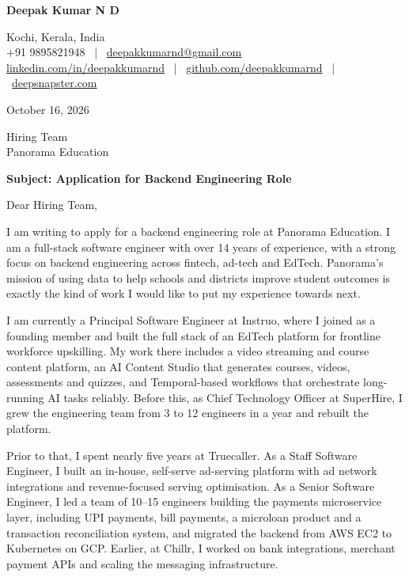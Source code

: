 \documentclass[11pt,a4paper]{article}
\begin{document}
{\large\bfseries Deepak Kumar N D}\par\vspace{-6pt}
Kochi, Kerala, India \\
+91 9895821948 \ | \ \href{mailto:deepakkumarnd@gmail.com}{deepakkumarnd@gmail.com} \\
\href{https://linkedin.com/in/deepakkumarnd}{linkedin.com/in/deepakkumarnd} \ | \
\href{https://github.com/deepakkumarnd}{github.com/deepakkumarnd} \ | \
\href{https://deepsnapster.com}{deepsnapster.com}

October 16, 2026

Hiring Team \\
Panorama Education

\textbf{Subject: Application for Backend Engineering Role}

Dear Hiring Team,

I am writing to apply for a backend engineering role at Panorama Education. I am a full-stack software engineer with over 14 years of experience, with a strong focus on backend engineering across fintech, ad-tech and EdTech. Panorama's mission of using data to help schools and districts improve student outcomes is exactly the kind of work I would like to put my experience towards next.

I am currently a Principal Software Engineer at Instruo, where I joined as a founding member and built the full stack of an EdTech platform for frontline workforce upskilling. My work there includes a video streaming and course content platform, an AI Content Studio that generates courses, videos, assessments and quizzes, and Temporal-based workflows that orchestrate long-running AI tasks reliably. Before this, as Chief Technology Officer at SuperHire, I grew the engineering team from 3 to 12 engineers in a year and rebuilt the platform.

Prior to that, I spent nearly five years at Truecaller. As a Staff Software Engineer, I built an in-house, self-serve ad-serving platform with ad network integrations and revenue-focused serving optimisation. As a Senior Software Engineer, I led a team of 10--15 engineers building the payments microservice layer, including UPI payments, bill payments, a microloan product and a transaction reconciliation system, and migrated the backend from AWS EC2 to Kubernetes on GCP. Earlier, at Chillr, I worked on bank integrations, merchant payment APIs and scaling the messaging infrastructure.
\end{document}
